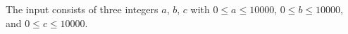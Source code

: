 
\begin{Input}

The input consists of three integers $a$, $b$, $c$ with 
$0\leq a\leq 10000$,
$0\leq b\leq 10000$, and
$0\leq c\leq 10000$.
\end{Input}
